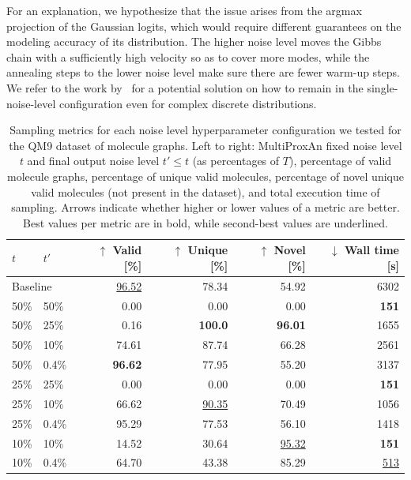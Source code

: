 For an explanation, we hypothesize that the issue arises from the argmax projection of the Gaussian logits, which would require different guarantees on the modeling accuracy of its distribution. The higher noise level moves the Gibbs chain with a sufficiently high velocity so as to cover more modes, while the annealing steps to the lower noise level make sure there are fewer warm-up steps. We refer to the work by~\cite{sahoo_diffusion_2025} for a potential solution on how to remain in the single-noise-level configuration even for complex discrete distributions. 

\begin{table}[H]
    \centering
    \caption[MultiProxAn sampling metrics for the QM9 dataset of molecule graphs.]{Sampling metrics for each noise level hyperparameter configuration we tested for the QM9 dataset of molecule graphs. Left to right: MultiProxAn fixed noise level $t$ and final output noise level $t' \leq t$ (as percentages of $T$), percentage of valid molecule graphs, percentage of unique valid molecules, percentage of novel unique valid molecules (not present in the dataset), and total execution time of sampling. Arrows indicate whether higher or lower values of a metric are better. Best values per metric are in bold, while second-best values are underlined.}
    \begin{tabular}{llrrrr}
        \toprule
         $t$ & $t'$ & $\uparrow$ Valid [\%] & $\uparrow$ Unique [\%] & $\uparrow$ Novel [\%] & $\downarrow$ Wall time [s]  \\
         \midrule
         \multicolumn{2}{l}{Baseline} & \underline{96.52} & 78.34 & 54.92 & 6302 \\
         50\% & 50\% & 0.00 & 0.00 & 0.00 & \textbf{151} \\
         50\% & 25\% & 0.16 & \textbf{100.0} & \textbf{96.01} & 1655 \\
         50\% & 10\% & 74.61 & 87.74 & 66.28 & 2561 \\
         50\% & 0.4\% & \textbf{96.62} & 77.95 & 55.20 & 3137 \\
         25\% & 25\% & 0.00 & 0.00 & 0.00 & \textbf{151} \\
         25\% & 10\% & 66.62 & \underline{90.35} & 70.49 & 1056 \\
         25\% & 0.4\% & 95.29 & 77.53 & 56.10 & 1418 \\
         10\% & 10\% & 14.52 & 30.64 & \underline{95.32} & \textbf{151} \\
         10\% & 0.4\% & 64.70 & 43.38 & 85.29 & \underline{513} \\
         \bottomrule
    \end{tabular}
    \label{tab:qm9_stats}
\end{table}

